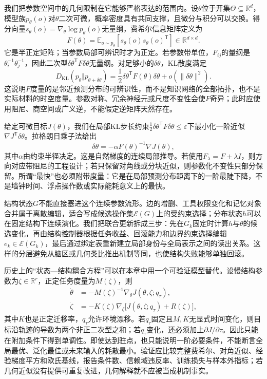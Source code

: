 我们把参数空间中的几何限制在它能够严格表达的范围内。设$\theta$位于开集$\Theta\subseteq\mathbb R^d$，模型族$p_\theta(o)$对$\theta$二次可微，概率密度具有共同支撑，且微分与积分可以交换。得分向量$s_\theta(o)=\nabla_\theta\log p_\theta(o)$无量纲，费希尔信息矩阵定义为
\begin{equation}
F(\theta)=\mathbb E_{o\sim p_\theta}\left[s_\theta(o)s_\theta(o)^{\mathsf T}\right]\in\mathbb R^{d\times d}.
\end{equation}
它是半正定矩阵；当参数局部可辨识时才为正定。若参数带单位，$F_{ij}$的量纲是$\theta_i^{-1}\theta_j^{-1}$，因此二次型$\delta\theta^{\mathsf T}F\delta\theta$无量纲。对足够小的$\delta\theta$，KL散度满足
\begin{equation}
D_{\mathrm{KL}}(p_\theta\Vert p_{\theta+\delta\theta})
=\frac12\delta\theta^{\mathsf T}F(\theta)\delta\theta+o(\|\delta\theta\|^2).
\end{equation}
这说明$F$度量的是邻近预测分布的可辨识性，而不是知识网络的全部拓扑，也不是实际材料的时空度量。参数对称、冗余神经元或尺度不变性会使$F$奇异；此时应使用阻尼、商空间或广义逆，不能假定逆矩阵天然存在。

给定可微目标$J(\theta)$，我们在局部KL步长约束$\frac12\delta\theta^{\mathsf T}F\delta\theta\leq\varepsilon$下最小化一阶近似$\nabla J^{\mathsf T}\delta\theta$。拉格朗日乘子法给出
\begin{equation}
\delta\theta=-\alpha F(\theta)^{-1}\nabla J(\theta),
\end{equation}
其中$\alpha$由约束半径决定。这是自然梯度的连续局部推导。若使用$F_\lambda=F+\lambda I$，则方向对应带阻尼的工程设计；若只保留对角线或分块近似，则参数化不变性只部分保留。所谓“最快”也必须附带度量：它是在局部预测分布距离下的一阶最陡下降，不是墙钟时间、浮点操作数或实际能耗意义上的最快。

结构状态$G$不能直接塞进这个连续参数流形。边的增删、工具权限变化和记忆对象合并属于离散编辑，适合写成候选操作集$\mathcal E(G)$上的受约束选择；分布状态$h$可以在固定结构下连续演化。我们把联合更新拆成三步：先在$G_k$固定时计算$h$与$\theta$的候选变化，再由结构控制器根据任务收益、回滚能力和边界约束选择编辑$e_k\in\mathcal E(G_k)$，最后通过绑定表重新建立局部身份与全局表示之间的读出关系。这样的分层避免从脑区或几何类比推出机制等同，也使结构失败能够单独回滚。

历史上的“状态—结构耦合方程”可以在本章中用一个可验证模型替代。设慢结构参数为$\zeta\in\mathbb R^r$，正定任务度量为$M(\zeta)$，则
\begin{align}
\dot\theta&=-M(\zeta)^{-1}\nabla_\theta J(\theta,\zeta;q_\tau),\\
\dot\zeta&=-K(\zeta)\nabla_\zeta\bigl[J(\theta,\zeta;q_\tau)+R(\zeta)\bigr],
\end{align}
其中$K$也是正定迁移率，$q_\tau$允许环境漂移。若$q_\tau$固定且$M,K$无显式时间变化，则目标沿轨迹的导数为两个非正二次型之和；若$q_\tau$变化，还必须加上$\partial J/\partial\tau$。因此只能在附加条件下得到单调性。即使达到驻点，也只能说明一阶必要条件，不能断言全局最优、泛化最佳或未来输入的耗散最小。验证应比较完整费希尔、对角近似、经验梯度平方和欧氏基线，报告条件数、信赖域违反率、训练损失与样本外指标；若几何近似没有提供可重复改进，几何解释就不应被当成机制事实。


